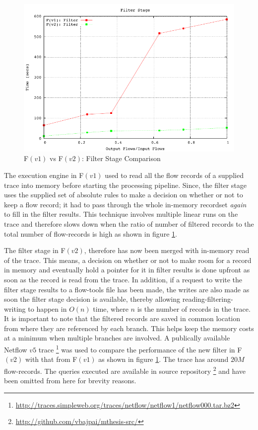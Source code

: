 \begin{figure}[h!]
  \begin{center}
    \includegraphics* [width=0.8\linewidth]{figures/benchmarks/filter-fv1-fv2}
    \caption{F$(v1)$ vs F$(v2)$: Filter Stage Comparison}
    \label{fig:fv1-fv2-filter}
  \end{center}
\end{figure}

The execution engine in F$(v1)$ used to read all the flow records of a
supplied trace into memory before starting the processing pipeline.  Since,
the filter stage uses the  supplied set of absolute rules to make a decision
on whether or not to keep a flow record; it had to pass through the whole
in-memory recordset \emph{again} to fill in the filter results. This technique
involves multiple linear runs on the trace and therefore slows down when the
ratio of number of filtered records to the total number of flow-records is
high as shown in figure \ref{fig:fv1-fv2-filter}.

The filter stage in F$(v2)$, therefore has now been merged with in-memory read
of the trace. This means, a decision on whether or not to make room for a
record in memory and eventually hold a pointer for it in filter results is
done upfront as soon as the record is read from the trace. In addition, if a
request to write the filter stage results to a flow-tools file has been made,
the writes are also made as soon the filter stage decision is available,
thereby    allowing reading-filtering-writing to
happen in $O(n)$ time, where $n$ is the number of records in the trace. It is
important to note that the filtered records are saved in common location from
where they are referenced by each branch. This helps keep the memory costs at
a minimum when multiple branches are involved. A publically available Netflow
$v5$ trace
\footnote{\url{http://traces.simpleweb.org/traces/netflow/netflow1/netflow000.tar.bz2}}
was used to compare the performance of the new filter in F$(v2)$ with that
from F$(v1)$ as shown in figure \ref{fig:fv1-fv2-filter}. The trace has around
$20M$ flow-records. The queries executed are available in source repository
\footnote{\url{http://github.com/vbajpai/mthesis-src/}} and have been omitted
from here for brevity reasons. 
